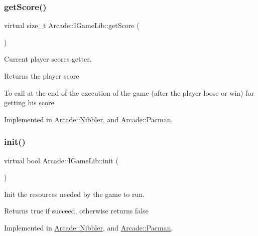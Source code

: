 \subsubsection{\texorpdfstring{get\+Score()}{getScore()}}
{\footnotesize\ttfamily virtual size\+\_\+t Arcade\+::\+I\+Game\+Lib\+::get\+Score (\begin{DoxyParamCaption}{ }\end{DoxyParamCaption})\hspace{0.3cm}{\ttfamily [pure virtual]}}



Current player score\textquotesingle{}s getter. 

\begin{DoxyReturn}{Returns}
the player score
\end{DoxyReturn}
To call at the end of the execution of the game (after the player loose or win) for getting his score 

Implemented in \hyperlink{class_arcade_1_1_nibbler_a861f3bebe3b7f5efe1f3a46eb71957bb}{Arcade\+::\+Nibbler}, and \hyperlink{class_arcade_1_1_pacman_a7683729dd33fb18673c4d77764ca1831}{Arcade\+::\+Pacman}.

\mbox{\label{class_arcade_1_1_i_game_lib_aacc4169a98dfeb007bcaf9dfeece9e08}} 
\subsubsection{\texorpdfstring{init()}{init()}}
{\footnotesize\ttfamily virtual bool Arcade\+::\+I\+Game\+Lib\+::init (\begin{DoxyParamCaption}{ }\end{DoxyParamCaption})\hspace{0.3cm}{\ttfamily [pure virtual]}}



Init the resources needed by the game to run. 

\begin{DoxyReturn}{Returns}
true if succeed, otherwise returns false 
\end{DoxyReturn}


Implemented in \hyperlink{class_arcade_1_1_nibbler_a244e3c4751d74cab7e4e6ef7b80d0b36}{Arcade\+::\+Nibbler}, and \hyperlink{class_arcade_1_1_pacman_a27b0ecc843707c735ed1b65e7da009e1}{Arcade\+::\+Pacman}.

